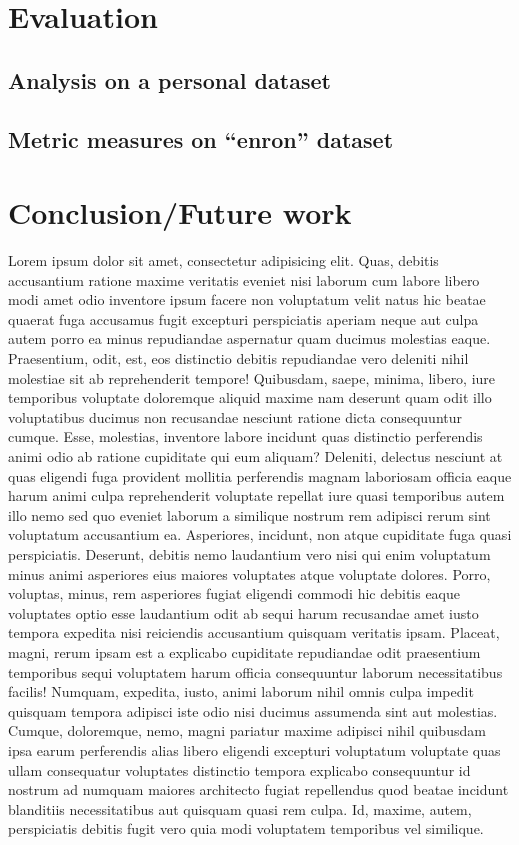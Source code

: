 \documentclass[a4paper,12pt]{report}
\begin{document}
\chapter{Evaluation}
\section{Analysis on a personal dataset}
\section{Metric measures on ``enron'' dataset}
\chapter{Conclusion/Future work}
Lorem ipsum dolor sit amet, consectetur adipisicing elit. Quas, debitis accusantium ratione maxime veritatis eveniet nisi laborum cum labore libero modi amet odio inventore ipsum facere non voluptatum velit natus hic beatae quaerat fuga accusamus fugit excepturi perspiciatis aperiam neque aut culpa autem porro ea minus repudiandae aspernatur quam ducimus molestias eaque. Praesentium, odit, est, eos distinctio debitis repudiandae vero deleniti nihil molestiae sit ab reprehenderit tempore! Quibusdam, saepe, minima, libero, iure temporibus voluptate doloremque aliquid maxime nam deserunt quam odit illo voluptatibus ducimus non recusandae nesciunt ratione dicta consequuntur cumque. Esse, molestias, inventore labore incidunt quas distinctio perferendis animi odio ab ratione cupiditate qui eum aliquam? Deleniti, delectus nesciunt at quas eligendi fuga provident mollitia perferendis magnam laboriosam officia eaque harum animi culpa reprehenderit voluptate repellat iure quasi temporibus autem illo nemo sed quo eveniet laborum a similique nostrum rem adipisci rerum sint voluptatum accusantium ea. Asperiores, incidunt, non atque cupiditate fuga quasi perspiciatis. Deserunt, debitis nemo laudantium vero nisi qui enim voluptatum minus animi asperiores eius maiores voluptates atque voluptate dolores. Porro, voluptas, minus, rem asperiores fugiat eligendi commodi hic debitis eaque voluptates optio esse laudantium odit ab sequi harum recusandae amet iusto tempora expedita nisi reiciendis accusantium quisquam veritatis ipsam. Placeat, magni, rerum ipsam est a explicabo cupiditate repudiandae odit praesentium temporibus sequi voluptatem harum officia consequuntur laborum necessitatibus facilis! Numquam, expedita, iusto, animi laborum nihil omnis culpa impedit quisquam tempora adipisci iste odio nisi ducimus assumenda sint aut molestias. Cumque, doloremque, nemo, magni pariatur maxime adipisci nihil quibusdam ipsa earum perferendis alias libero eligendi excepturi voluptatum voluptate quas ullam consequatur voluptates distinctio tempora explicabo consequuntur id nostrum ad numquam maiores architecto fugiat repellendus quod beatae incidunt blanditiis necessitatibus aut quisquam quasi rem culpa. Id, maxime, autem, perspiciatis debitis fugit vero quia modi voluptatem temporibus vel similique.

\end{document}
